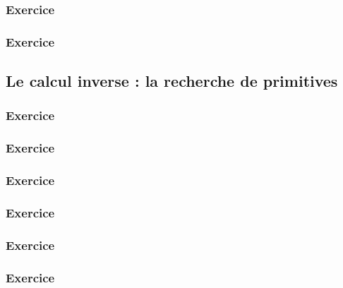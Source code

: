 \documentclass[10pt,a4paper]{article}
\begin{document}
\subsubsection{Exercice}


\subsubsection{Exercice}

\subsection{Le calcul inverse : la recherche de primitives}

\subsubsection{Exercice}

\subsubsection{Exercice}

\subsubsection{Exercice}

\subsubsection{Exercice}

\subsubsection{Exercice}

\subsubsection{Exercice}
\end{document}
